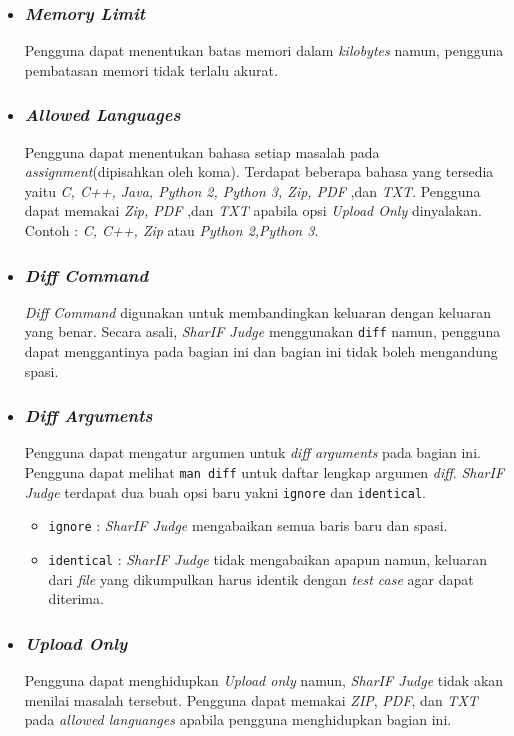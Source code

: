 \begin{itemize}
\item \subsubsection{\textit{Memory Limit}}
Pengguna dapat menentukan batas memori dalam \textit{kilobytes} namun, pengguna pembatasan memori tidak terlalu akurat.

\item \subsubsection{\textit{Allowed Languages}}
Pengguna dapat menentukan bahasa setiap masalah pada \textit{assignment}(dipisahkan oleh koma). Terdapat beberapa bahasa yang tersedia yaitu \textit{C, C++, Java, Python 2, Python 3, Zip, PDF} ,dan \textit{TXT}. Pengguna dapat memakai \textit{Zip, PDF} ,dan \textit{TXT} apabila opsi \textit{Upload Only} dinyalakan. Contoh : \textit{C, C++, Zip} atau \textit{Python 2,Python 3}.

\item \subsubsection{\textit{Diff Command}}
\textit{Diff Command} digunakan untuk membandingkan keluaran dengan keluaran yang benar. Secara asali, \textit{SharIF Judge} menggunakan \verb|diff| namun, pengguna dapat menggantinya pada bagian ini dan bagian ini tidak boleh mengandung spasi.

\item \subsubsection{\textit{Diff Arguments}}
Pengguna dapat mengatur argumen untuk \textit{diff arguments} pada bagian ini. Pengguna dapat melihat \verb|man diff| untuk daftar lengkap argumen \textit{diff}. \textit{SharIF Judge} terdapat dua buah opsi baru yakni \verb|ignore| dan \verb|identical|.
\begin{itemize}
\item \verb|ignore| : \textit{SharIF Judge} mengabaikan semua baris baru dan spasi.
\item \verb|identical| : \textit{SharIF Judge} tidak mengabaikan apapun namun, keluaran dari \textit{file} yang dikumpulkan harus identik dengan \textit{test case} agar dapat diterima. 
\end{itemize}

\item \subsubsection{\textit{Upload Only}}
Pengguna dapat menghidupkan \textit{Upload only} namun, \textit{SharIF Judge} tidak akan menilai masalah tersebut. Pengguna dapat memakai \textit{ZIP}, \textit{PDF}, dan \textit{TXT} pada \textit{allowed languanges} apabila pengguna menghidupkan bagian ini.

\end{itemize}

